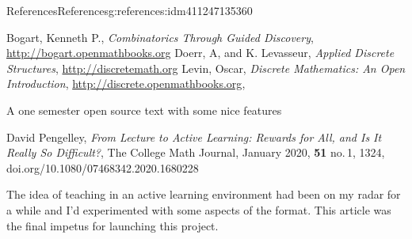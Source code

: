 \documentclass[oneside,10pt,]{book}
\newcommand{\xreffont}{\relax}
\numberwithin{equation}{section}
\begin{document}
\begin{references-chapter-numberless}{References}{}{References}{}{}{g:references:idm411247135360}
%
\begin{referencelist}
\hypertarget{x:biblio:biblio-bogart-2017}{}Bogart, Kenneth P., \textit{Combinatorics Through Guided Discovery}, \href{http://bogart.openmathbooks.org}{http:\slash{}\slash{}bogart.openmathbooks.org}
\hypertarget{x:biblio:biblio-doerr-2019}{}Doerr, A, and K. Levasseur, \textit{Applied Discrete Structures}, \href{http://discretemath.org}{http:\slash{}\slash{}discretemath.org}
\hypertarget{x:biblio:biblio-levin-2020}{}Levin, Oscar, \textit{Discrete Mathematics: An Open Introduction}, \href{http://discrete.openmathbooks.org}{http:\slash{}\slash{}discrete.openmathbooks.org}, \par%
A one semester open source text with some nice features%

\hypertarget{x:biblio:biblio-pengelley}{}David Pengelley, \textit{From Lecture to Active Learning: Rewards for All, and Is It Really So Difficult?}, The College Math Journal, January 2020, \textbf{51} no.\@\,1, 13\textendash{}24, doi.org\slash{}10.1080\slash{}07468342.2020.1680228\par%
The idea of teaching in an active learning environment had been on my radar for a while and I'd experimented with some aspects of the format. This article was the final impetus for launching this project.%

\end{referencelist}
\end{references-chapter-numberless}
%
{\xreffont\printindex}
%
\end{document}
